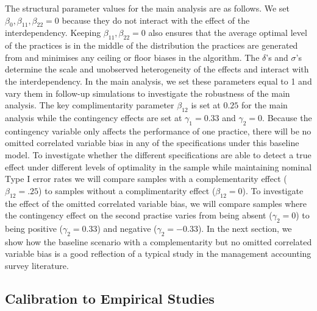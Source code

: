 \documentclass[12pt]{article}
\begin{document}
The structural parameter values for the main analysis are as follows. We set $\beta_0, \beta_{11}, \beta_{22} = 0$ because they do not interact with the effect of the interdependency. Keeping $\beta_{11}, \beta_{22} = 0$ also ensures that the average optimal level of the practices is in the middle of the distribution the practices are generated from and minimises any ceiling or floor biases in the algorithm.  The $\delta$'s and $\sigma$'s determine the scale and unobserved heterogeneity of the effects and interact with the interdependency. In the main analysis, we set these parameters equal to 1 and vary them in follow-up simulations to investigate the robustness of the main analysis. The key complimentarity parameter $\beta_{12}$ is set at $0.25$ for the main analysis while the contingency effects are set at $\gamma_1 = 0.33$ and $\gamma_2 = 0$. Because the contingency variable only affects the performance of one practice, there will be no omitted correlated variable bias in any of the specifications under this baseline model. To investigate whether the different specifications are able to detect a true effect under different levels of optimality in the sample while maintaining nominal Type I error rates we will compare samples with a complementarity effect ($\beta_{12} = .25$) to samples without a complimentarity effect ($\beta_{12} = 0$). To investigate the effect of the omitted correlated variable bias, we will compare samples where the contingency effect on the second practise varies from being absent ($\gamma_2 = 0$) to being positive ($\gamma_2 = 0.33$) and negative ($\gamma_2 = -0.33$).  In the next section, we show how the baseline scenario with a complementarity but no omitted correlated variable bias is a good reflection of a typical study in the management accounting survey literature.

\subsection{Calibration to Empirical Studies}\label{optimality}
\end{document}
